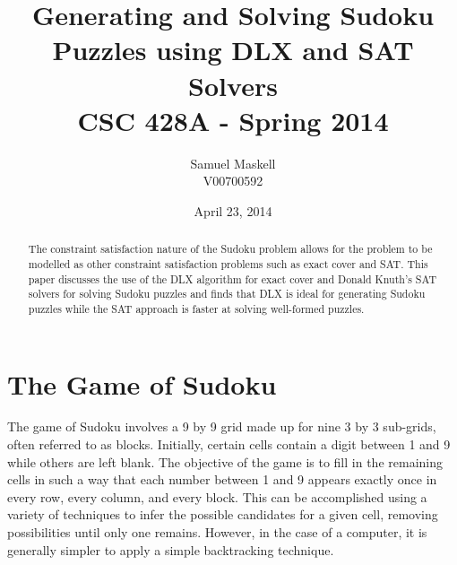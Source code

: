 \documentclass[12pt]{article}
\title{Generating and Solving Sudoku Puzzles using DLX and SAT Solvers\\CSC 428A - Spring 2014}
\date{April 23, 2014}
\author{Samuel Maskell\\ V00700592}
\newcounter{row}
\newcounter{col}
\begin{document}
\begin{titlepage}
\maketitle
\thispagestyle{empty}
\null
\vfill
\begin{abstract}
\noindent{}The constraint satisfaction nature of the Sudoku problem allows for the problem to be modelled as other constraint satisfaction problems such as exact cover and SAT. This paper discusses the use of the DLX algorithm for exact cover and Donald Knuth's SAT solvers for solving Sudoku puzzles and finds that DLX is ideal for generating Sudoku puzzles while the SAT approach is faster at solving well-formed puzzles.
\end{abstract}
\end{titlepage}
\pagestyle{fancy}
\section{The Game of Sudoku}
The game of Sudoku involves a 9 by 9 grid made up for nine 3 by 3 sub-grids, often referred to as blocks. Initially, certain cells contain a digit between 1 and 9 while others are left blank. The objective of the game is to fill in the remaining cells in such a way that each number between 1 and 9 appears exactly once in every row, every column, and every block. This can be accomplished using a variety of techniques to infer the possible candidates for a given cell, removing possibilities until only one remains. However, in the case of a computer, it is generally simpler to apply a simple backtracking technique. \\
\end{document}
